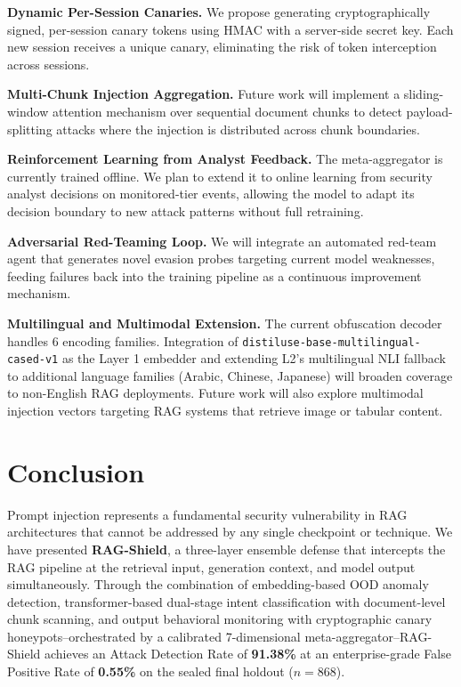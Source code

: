 \documentclass[conference]{IEEEtran}
\begin{document}
\textbf{Dynamic Per-Session Canaries.} We propose generating cryptographically signed, per-session canary tokens using HMAC with a server-side secret key. Each new session receives a unique canary, eliminating the risk of token interception across sessions.


\textbf{Multi-Chunk Injection Aggregation.} Future work will implement a sliding-window attention mechanism over sequential document chunks to detect payload-splitting attacks where the injection is distributed across chunk boundaries.


\textbf{Reinforcement Learning from Analyst Feedback.} The meta-aggregator is currently trained offline. We plan to extend it to online learning from security analyst decisions on monitored-tier events, allowing the model to adapt its decision boundary to new attack patterns without full retraining.


\textbf{Adversarial Red-Teaming Loop.} We will integrate an automated red-team agent that generates novel evasion probes targeting current model weaknesses, feeding failures back into the training pipeline as a continuous improvement mechanism.


\textbf{Multilingual and Multimodal Extension.} The current obfuscation decoder handles 6 encoding families. Integration of \texttt{distiluse-base-multilingual-cased-v1} as the Layer 1 embedder and extending L2's multilingual NLI fallback to additional language families (Arabic, Chinese, Japanese) will broaden coverage to non-English RAG deployments. Future work will also explore multimodal injection vectors targeting RAG systems that retrieve image or tabular content.



\section{Conclusion}

Prompt injection represents a fundamental security vulnerability in RAG architectures that cannot be addressed by any single checkpoint or technique. We have presented \textbf{RAG-Shield}, a three-layer ensemble defense that intercepts the RAG pipeline at the retrieval input, generation context, and model output simultaneously. Through the combination of embedding-based OOD anomaly detection, transformer-based dual-stage intent classification with document-level chunk scanning, and output behavioral monitoring with cryptographic canary honeypots--orchestrated by a calibrated 7-dimensional meta-aggregator--RAG-Shield achieves an Attack Detection Rate of \textbf{91.38\%} at an enterprise-grade False Positive Rate of \textbf{0.55\%} on the sealed final holdout ($n = 868$).
\end{document}
